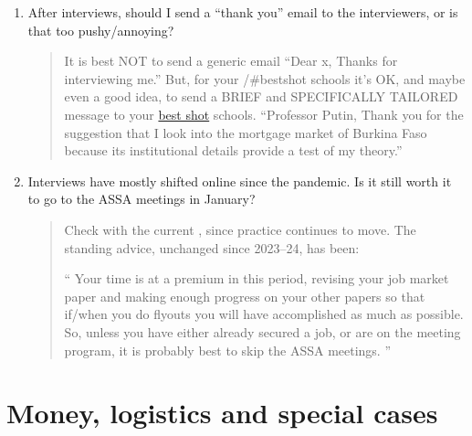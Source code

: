 \documentclass{\classes/econtex}
\begin{document}
\begin{enumerate}
\begin{quote}
  \end{quote}

\item  After interviews, should I send a ``thank you'' email to the interviewers, or is that too pushy/annoying?
  \begin{quote}
    It is best NOT to send a generic email ``Dear x, Thanks for interviewing me.''  But, for your {\Stepspage/\#bestshot} schools it's OK, and maybe even a good idea, to send a BRIEF and SPECIFICALLY TAILORED message to your \href{\Stepspage/\#best-shot}{best shot} schools.  ``Professor Putin, Thank you for the suggestion that I look into the mortgage market of Burkina Faso because its institutional details provide a test of my theory.''

    \hypertarget{restricted-data}{}  
  \end{quote}

\item Interviews have mostly shifted online since the pandemic. Is it still worth it to go to the ASSA meetings in January?

\begin{quote}
	Check with the current {\JMPO}, since practice continues to move.  The
	standing advice, unchanged since 2023--24, has been:

	``
	Your time is at a premium in this period, revising your job market paper and making enough progress on your other papers so that if/when you do flyouts you will have accomplished as much as possible.  So, unless you have either already secured a job, or are on the meeting program, it is probably best to skip the ASSA meetings.
	''
\end{quote}
\end{enumerate}

\section*{Money, logistics and special cases}
\end{document}
